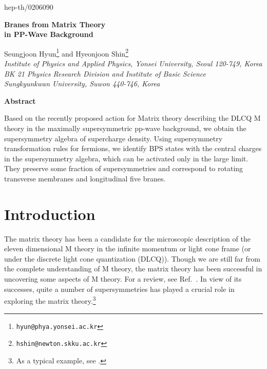 \documentclass[a4paper,12pt]{article}
\begin{document}
\renewcommand{\thefootnote}{\fnsymbol{footnote}}

\begin{titlepage}
\hfill{hep-th/0206090}
\vspace{15mm}
\baselineskip 8mm

\begin{center}
{\LARGE \bf Branes from Matrix Theory \\
in PP-Wave Background }
\end{center}
\baselineskip 6mm
\vspace{10mm}
\begin{center}
Seungjoon Hyun\coordHE{}\footnote{\tt hyun@phya.yonsei.ac.kr} and
Hyeonjoon Shin\coordHE{}\footnote{\tt hshin@newton.skku.ac.kr} \\[5mm]
{\it
{}\coordHE{}Institute of Physics and Applied Physics, Yonsei University,
Seoul 120-749, Korea \\
\coordHE{} BK 21 Physics Research Division and Institute of Basic Science \\
Sungkyunkwan University, Suwon 440-746, Korea}
\end{center}

\thispagestyle{empty}


\vfill

\begin{center}
{\bf Abstract}
\end{center}
\noindent Based on the recently proposed action for Matrix theory
describing the DLCQ M theory in the maximally supersymmetric
pp-wave background, we obtain the supersymmetry algebra of
supercharge density.  Using supersymmetry transformation rules for
fermions, we identify BPS states with the central charges in the
supersymmetry algebra, which can be activated only in the large
\coordHE{} limit. They preserve some fraction of supersymmetries and
correspond to rotating transverse membranes and longitudinal five
branes.

\vspace{20mm}
\end{titlepage}

\baselineskip 6.5mm
\renewcommand{\thefootnote}{\arabic{footnote}}
\setcounter{footnote}{0}


\section{Introduction}

The matrix theory has been a candidate for the microscopic
description of the eleven dimensional M theory in the infinite
momentum \cite{ban043} or light cone frame
\cite{sus080,sei009,sen220} (or under the discrete light cone
quantization (DLCQ)).  Though we are still far from the complete
understanding of M theory, the matrix theory has been successful
in uncovering some aspects of M theory. For a review, see
Ref.~\cite{tay126}.  In view of its successes, quite a number of
supersymmetries has played a crucial role in exploring the matrix
theory.\footnote{As a typical example, see \cite{hyu022}.}
\end{document}
